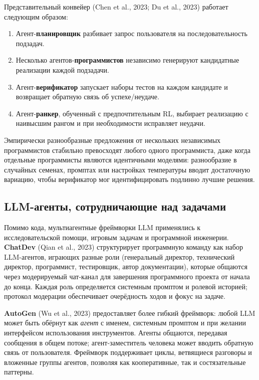 Представительный конвейер (Chen et al., 2023; Du et al., 2023) работает
следующим образом:
\begin{enumerate}[leftmargin=*]
  \item Агент-\textbf{планировщик} разбивает запрос пользователя на
    последовательность подзадач.
  \item Несколько агентов-\textbf{программистов} независимо генерируют
    кандидатные реализации каждой подзадачи.
  \item Агент-\textbf{верификатор} запускает наборы тестов на каждом кандидате
    и возвращает обратную связь об успехе/неудаче.
  \item Агент-\textbf{ранкер}, обученный с предпочтительным RL, выбирает
    реализацию с наивысшим рангом и при необходимости исправляет неудачи.
\end{enumerate}
Эмпирически разнообразные предложения от нескольких независимых программистов
стабильно превосходят любого одного программиста, даже когда отдельные
программисты являются идентичными моделями: разнообразие в случайных семенах, промптах или
настройках температуры вводит достаточную вариацию, чтобы верификатор
мог идентифицировать подлинно лучшие решения.

\subsection{LLM-агенты, сотрудничающие над задачами}

Помимо кода, мультиагентные фреймворки LLM применялись к исследовательской
помощи, игровым задачам и программной инженерии. \textbf{ChatDev}
(Qian et al., 2023) структурирует программную команду как набор LLM-агентов,
играющих разные роли (генеральный директор, технический директор, программист, тестировщик, автор документации),
которые общаются через модерируемый чат-канал для завершения программного
проекта от начала до конца. Каждая роль определяется системным промптом и
ролевой историей; протокол модерации обеспечивает очерёдность ходов
и фокус на задаче.

\textbf{AutoGen} (Wu et al., 2023) предоставляет более
гибкий фреймворк: любой LLM может быть обёрнут как \emph{агент} с
именем, системным промптом и при желании интерфейсом использования инструментов. Агенты
общаются, передавая сообщения в общем потоке; агент-заместитель
человека может вводить обратную связь от пользователя. Фреймворк поддерживает циклы, ветвящиеся
разговоры и вложенные группы агентов, позволяя как кооперативные, так и
состязательные паттерны.

